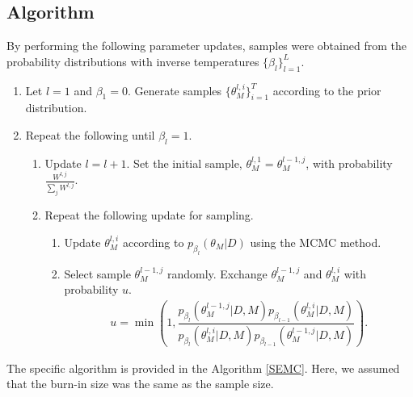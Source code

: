 \documentclass[12pt]{article}
\begin{document}
\subsection{Algorithm}
By performing the following parameter updates, samples were obtained from the probability distributions with inverse temperatures $\{\beta_l\}_{l=1}^L$. \par
\begin{enumerate}
  \item Let $l = 1$ and $\beta_1 = 0$. Generate samples $\{\theta_M^{l,i}\}_{i=1}^T$ according to the prior distribution.
  \item Repeat the following until $\beta_l = 1$.
  \begin{enumerate}
    \item Update $l = l + 1$. Set the initial sample, $\theta_M^{l,1} = \theta_M^{l-1,j}$, with probability $\frac{W^{l,j}}{\sum_j W^{l,j}}$.
    \item Repeat the following update for sampling.
    \begin{enumerate}
      \item Update $\theta_M^{l,i}$ according to $p_{\beta_l}(\theta_M|D)$ using the MCMC method.
      \item Select sample $\theta_M^{l-1,j}$ randomly. Exchange $\theta_M^{l-1,j}$ and $\theta_M^{l,i}$ with probability $u$.
      \begin{align}
          u = \min\left(1, \dfrac{p_{\beta_{l}}(\theta_M^{l-1,j}|D,M)p_{\beta_{l-1}}(\theta_M^{l,i}|D,M)}{p_{\beta_{l}}(\theta_M^{l,i}|D,M)p_{\beta_{l-1}}(\theta_M^{l-1,j}|D,M)}\right).
      \end{align}
    \end{enumerate}
  \end{enumerate}
\end{enumerate}
The specific algorithm is provided in the Algorithm \ref{SEMC}. Here, we assumed that the burn-in size was the same as the sample size. \par
\end{document}
